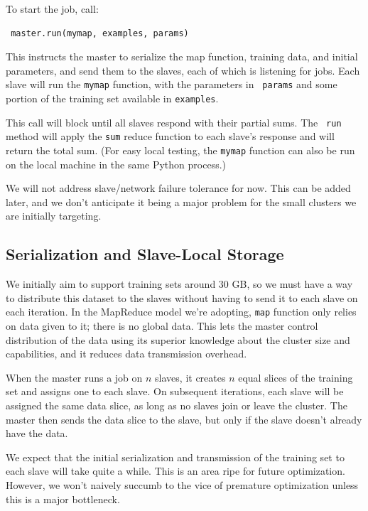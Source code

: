 \documentclass[%
  final,
  notitlepage,
  narroweqnarray,
  inline,
]{ieee}
\begin{document}
To start the job, call:

\begin{verbatim}
 master.run(mymap, examples, params)
\end{verbatim}

This instructs the master to serialize the map function, training data, and
initial parameters, and send them to the slaves, each of which is listening for
jobs. Each slave will run the {\tt mymap} function, with the parameters in {\tt
  params} and some portion of the training set available in {\tt examples}.

This call will block until all slaves respond with their partial sums. The {\tt
  run} method will apply the {\tt sum} reduce function to each slave's response
and will return the total sum. (For easy local testing, the {\tt mymap}
function can also be run on the local machine in the same Python process.)

We will not address slave/network failure tolerance for now. This can be added
later, and we don't anticipate it being a major problem for the small clusters
we are initially targeting.

\subsection{Serialization and Slave-Local Storage}

We initially aim to support training sets around 30 GB, so we must have a way
to distribute this dataset to the slaves without having to send it to each
slave on each iteration. In the MapReduce model we're adopting, {\tt map}
function only relies on data given to it; there is no global data. This lets
the master control distribution of the data using its superior knowledge about
the cluster size and capabilities, and it reduces data transmission overhead.

When the master runs a job on $n$ slaves, it creates $n$ equal slices of the
training set and assigns one to each slave. On subsequent iterations, each
slave will be assigned the same data slice, as long as no slaves join or leave
the cluster. The master then sends the data slice to the slave, but only if the
slave doesn't already have the data.

We expect that the initial serialization and transmission of the training set
to each slave will take quite a while. This is an area ripe for future
optimization. However, we won't naively succumb to the vice of premature
optimization unless this is a major bottleneck.
\end{document}
